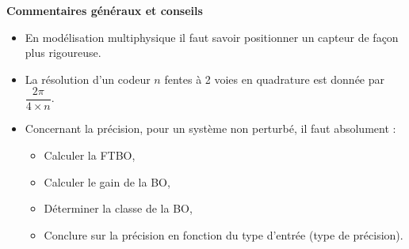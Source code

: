 \documentclass[10pt,fleqn]{book} %
\begin{document}

\pagestyle{fancy}
\thispagestyle{plain}


\def\columnseprulecolor{\color{ocre}}
\setlength{\columnseprule}{0.4pt} 



\vspace{6cm}


\textbf{Commentaires généraux et conseils}
\begin{itemize}
\item En modélisation multiphysique il faut savoir positionner un capteur de façon plus rigoureuse. 
\item La résolution d'un codeur $n$ fentes à 2 voies en quadrature est donnée par $\dfrac{2\pi}{4 \times n}$.
\item Concernant la précision, pour un système non perturbé, il faut absolument : 
\begin{itemize}
\item Calculer la FTBO,
\item Calculer le gain de la BO,
\item Déterminer la classe de la BO,
\item Conclure sur la précision en fonction du type d'entrée (type de précision).
\end{itemize}
\end{itemize}





%
\end{document}
